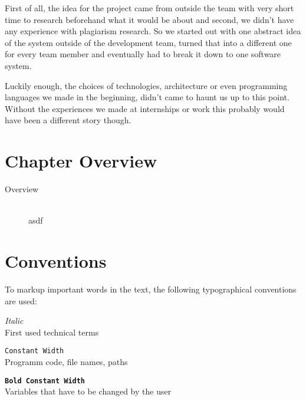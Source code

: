 First of all, the idea for the project came from outside the team with very short time to research beforehand what it would be 
about and second, we didn't have any experience with plagiarism research. So we started out with one abstract idea of the system 
outside of the development team, turned that into a different one for every team member and eventually had to break it down to one software system.

Luckily enough, the choices of technologies, architecture or even programming languages we made in the beginning, didn't came to haunt us up to this point. Without the experiences we made at internships or work this probably would have been a different story though.

\section*{Chapter Overview}

\begin{description}
\item[Overview] \hfill \\
asdf
\end{description}

\section*{Conventions}

To markup important words in the text, the following typographical conventions are used:

\begin{description}
\item \textit{Italic} \hfill \\
  First used technical terms
\item \texttt{Constant Width} \hfill \\
  Programm code, file names, paths
\item \textbf{\texttt{Bold Constant Width}} \hfill \\
  Variables that have to be changed by the user
\end{description}
